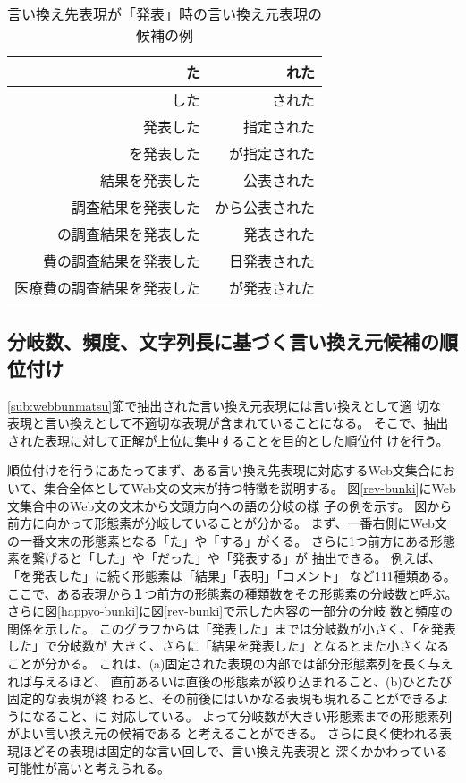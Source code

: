 \documentclass[jnlpbbl]{jnlp_j}
\begin{document}
\begin{table}[htb]
\caption{言い換え先表現が「発表」時の言い換え元表現の候補の例}
\label{iikae-chushutu}
\begin{center}
\begin{tabular}{|r|r|} \hline
た                        & れた \\\hline
した                      & された \\\hline
発表した                  & 指定された \\\hline
を発表した                & が指定された \\\hline
結果を発表した            & 公表された \\\hline
調査結果を発表した        & から公表された \\\hline
の調査結果を発表した      & 発表された \\\hline
費の調査結果を発表した    & 日発表された \\\hline
医療費の調査結果を発表した& が発表された \\\hline

\end{tabular}
\end{center}
\end{table}

\subsection{分岐数、頻度、文字列長に基づく言い換え元候補の順位付け}\label{sub:junni}

\ref{sub:webbunmatsu}節で抽出された言い換え元表現には言い換えとして適
切な
表現と言い換えとして不適切な表現が含まれていることになる。
そこで、抽出された表現に対して正解が上位に集中することを目的とした順位付
けを行う。

順位付けを行うにあたってまず、ある言い換え先表現に対応するWeb文集合にお
いて、集合全体としてWeb文の文末が持つ特徴を説明する。
図\ref{rev-bunki}にWeb文集合中のWeb文の文末から文頭方向への語の分岐の様
子の例を示す。
図から前方に向かって形態素が分岐していることが分かる。
まず、一番右側にWeb文の一番文末の形態素となる「た」や「する」がくる。
さらに1つ前方にある形態素を繋げると「した」や「だった」や「発表する」が
抽出できる。
例えば、「を発表した」に続く形態素は「結果」「表明」「コメント」
など111種類ある。
ここで、ある表現から１つ前方の形態素の種類数をその形態素の分岐数と呼ぶ。
さらに図\ref{happyo-bunki}に図\ref{rev-bunki}で示した内容の一部分の分岐
数と頻度の関係を示した。
このグラフからは「発表した」までは分岐数が小さく、「を発表した」で分岐数が
大きく、さらに「結果を発表した」となるとまた小さくなることが分かる。
これは、(a)固定された表現の内部では部分形態素列を長く与えれば与えるほど、
直前あるいは直後の形態素が絞り込まれること、(b)ひとたび固定的な表現が終
わると、その前後にはいかなる表現も現れることができるようになること、に
対応している。
よって分岐数が大きい形態素までの形態素列がよい言い換え元の候補である
と考えることができる。
さらに良く使われる表現ほどその表現は固定的な言い回しで、言い換え先表現と
深くかかわっている可能性が高いと考えられる。
\end{document}
